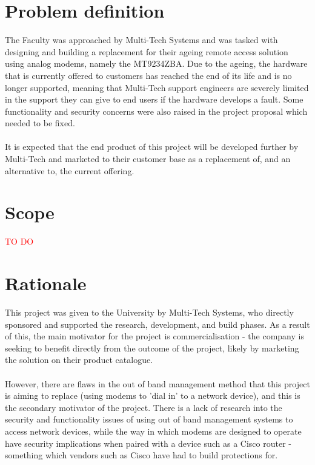 \section{Problem definition}
\label{section:intro-definition}
The Faculty was approached by Multi-Tech Systems and was tasked with designing and building a replacement for their ageing remote access solution using analog modems, namely the MT9234ZBA. Due to the ageing, the hardware that is currently offered to customers has reached the end of its life and is no longer supported, meaning that Multi-Tech support engineers are severely limited in the support they can give to end users if the hardware develops a fault. Some functionality and security concerns were also raised in the project proposal which needed to be fixed. \\\\
It is expected that the end product of this project will be developed further by Multi-Tech and marketed to their customer base as a replacement of, and an alternative to, the current offering. 

\section{Scope}
\label{section:intro-scope}
\textcolor{red}{TO DO}

\section{Rationale}
\label{section:intro-rationale}
This project was given to the University by Multi-Tech Systems, who directly sponsored and supported the research, development, and build phases. As a result of this, the main motivator for the project is commercialisation - the company is seeking to benefit directly from the outcome of the project, likely by marketing the solution on their product catalogue. \\\\
However, there are flaws in the out of band management method that this project is aiming to replace (using modems to 'dial in' to a network device), and this is the secondary motivator of the project. There is a lack of research into the security and functionality issues of using out of band management systems to access network devices, while the way in which modems are designed to operate have security implications when paired with a device such as a Cisco router - something which vendors such as Cisco have had to build protections for.

